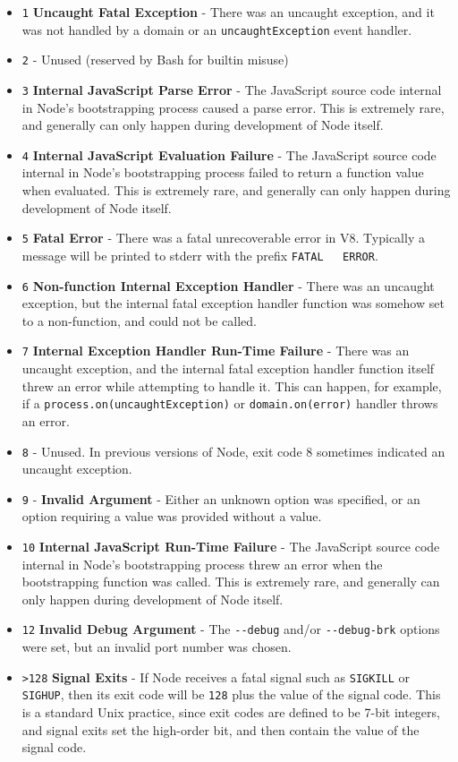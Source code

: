 \begin{itemize}
\itemsep1pt\parskip0pt
\item
  \texttt{1} \textbf{Uncaught Fatal Exception} - There was an uncaught
  exception, and it was not handled by a domain or an
  \texttt{uncaughtException} event handler.
\item
  \texttt{2} - Unused (reserved by Bash for builtin misuse)
\item
  \texttt{3} \textbf{Internal JavaScript Parse Error} - The JavaScript
  source code internal in Node's bootstrapping process caused a parse
  error. This is extremely rare, and generally can only happen during
  development of Node itself.
\item
  \texttt{4} \textbf{Internal JavaScript Evaluation Failure} - The
  JavaScript source code internal in Node's bootstrapping process failed
  to return a function value when evaluated. This is extremely rare, and
  generally can only happen during development of Node itself.
\item
  \texttt{5} \textbf{Fatal Error} - There was a fatal unrecoverable
  error in V8. Typically a message will be printed to stderr with the
  prefix \texttt{FATAL\ \ \ ERROR}.
\item
  \texttt{6} \textbf{Non-function Internal Exception Handler} - There
  was an uncaught exception, but the internal fatal exception handler
  function was somehow set to a non-function, and could not be called.
\item
  \texttt{7} \textbf{Internal Exception Handler Run-Time Failure} -
  There was an uncaught exception, and the internal fatal exception
  handler function itself threw an error while attempting to handle it.
  This can happen, for example, if a
  \texttt{process.on(\textquotesingle{}uncaughtException\textquotesingle{})}
  or \texttt{domain.on(\textquotesingle{}error\textquotesingle{})}
  handler throws an error.
\item
  \texttt{8} - Unused. In previous versions of Node, exit code 8
  sometimes indicated an uncaught exception.
\item
  \texttt{9} - \textbf{Invalid Argument} - Either an unknown option was
  specified, or an option requiring a value was provided without a
  value.
\item
  \texttt{10} \textbf{Internal JavaScript Run-Time Failure} - The
  JavaScript source code internal in Node's bootstrapping process threw
  an error when the bootstrapping function was called. This is extremely
  rare, and generally can only happen during development of Node itself.
\item
  \texttt{12} \textbf{Invalid Debug Argument} - The \texttt{-\/-debug}
  and/or \texttt{-\/-debug-brk} options were set, but an invalid port
  number was chosen.
\item
  \texttt{\textgreater{}128} \textbf{Signal Exits} - If Node receives a
  fatal signal such as \texttt{SIGKILL} or \texttt{SIGHUP}, then its
  exit code will be \texttt{128} plus the value of the signal code. This
  is a standard Unix practice, since exit codes are defined to be 7-bit
  integers, and signal exits set the high-order bit, and then contain
  the value of the signal code.
\end{itemize}

